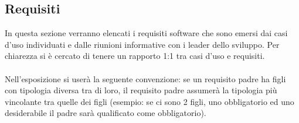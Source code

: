 \documentclass[a4paper,13pt,twoside]{article}
\begin{document}
\subsection{Requisiti} \label{sec:req}
In questa sezione verranno elencati i requisiti software che sono emersi dai casi d'uso individuati e dalle riunioni informative con i leader dello sviluppo. Per chiarezza si è cercato di tenere un rapporto 1:1 tra casi d'uso e requisiti.
 \\ \\Nell'esposizione si userà la seguente convenzione: se un requisito padre ha figli con tipologia diversa tra di loro, il requisito padre assumerà la tipologia più vincolante tra quelle dei figli (esempio: se ci sono 2 figli, uno obbligatorio ed uno desiderabile il padre sarà qualificato come obbligatorio).


\newpage





\newpage

%
%


%

\appendix
%
%
%
\end{document}
